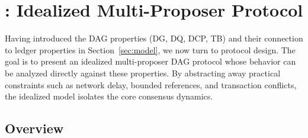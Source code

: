 
\section{\ProjIdeal: Idealized Multi-Proposer Protocol}
\label{sec:ideal}
Having introduced the DAG properties (DG, DQ, DCP, TB) and their connection to ledger properties in Section~\ref{sec:model}, we now turn to protocol design. The goal is to present an idealized multi-proposer DAG protocol whose behavior can be analyzed directly against these properties. By abstracting away practical constraints such as network delay, bounded references, and transaction conflicts, the idealized model isolates the core consensus dynamics. 

\subsection{Overview}
